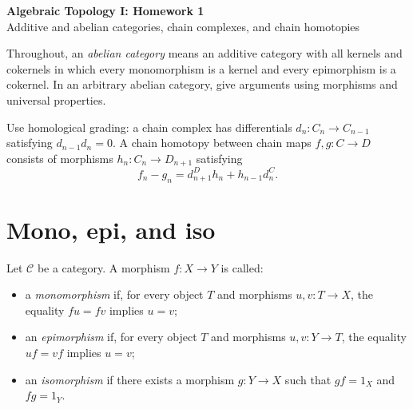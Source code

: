 \documentclass[11pt]{article}
\begin{document}
\begin{center}
  {\Large\bfseries Algebraic Topology I: Homework 1}\\[.4em]
  Additive and abelian categories, chain complexes, and chain homotopies
\end{center}

Throughout, an \emph{abelian category} means an additive category with all
kernels and cokernels in which every monomorphism is a kernel and every
epimorphism is a cokernel. In an arbitrary abelian category, give arguments
using morphisms and universal properties.

Use homological grading: a chain complex has differentials
\(d_n:C_n\to C_{n-1}\) satisfying \(d_{n-1}d_n=0\).
A chain homotopy between chain maps \(f,g:C\to D\) consists of morphisms
\(h_n:C_n\to D_{n+1}\) satisfying
\[
f_n-g_n=d^D_{n+1}h_n+h_{n-1}d^C_n.
\]

\section{Mono, epi, and iso}
Let \(\mathcal C\) be a category. A morphism \(f:X\to Y\) is called:
\begin{itemize}[leftmargin=*]
\item a \emph{monomorphism} if, for every object \(T\) and morphisms
\(u,v:T\to X\), the equality \(fu=fv\) implies \(u=v\);
\item an \emph{epimorphism} if, for every object \(T\) and morphisms
\(u,v:Y\to T\), the equality \(uf=vf\) implies \(u=v\);
\item an \emph{isomorphism} if there exists a morphism \(g:Y\to X\)
such that \(gf=1_X\) and \(fg=1_Y\).
\end{itemize}
\end{document}
